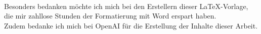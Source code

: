 \vspace*{\fill}
\begin{center}
  \begin{minipage}{.8\textwidth}
    \centering
    \large
    \textbf{}\\[1em]
    Besonders bedanken möchte ich mich bei den Erstellern dieser \LaTeX -Vorlage, die mir zahllose Stunden der Formatierung mit Word erspart haben.\\[1em]
    Zudem bedanke ich mich bei OpenAI für die Erstellung der Inhalte dieser Arbeit.
  \end{minipage}
\end{center}
\vspace*{\fill}